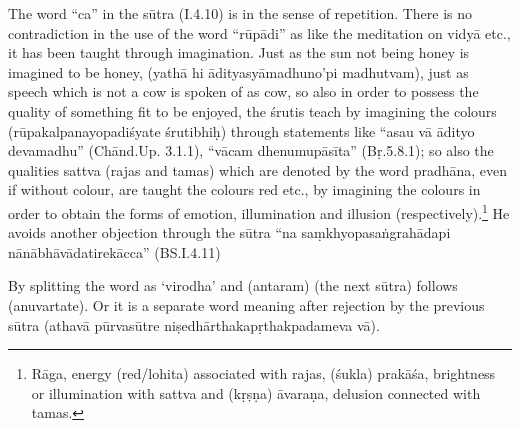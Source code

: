 The word “ca” in the sūtra (I.4.10) is in the sense of repetition. There is no contradiction in the use of the word “rūpādi” as like the meditation on vidyā etc., it has been taught through imagination. Just as the sun not being honey is  imagined to be  honey, (yathā hi ādityasyāmadhuno’pi madhutvam), just as speech which is not a cow is spoken of as cow, so also in order to possess the quality of something fit to be enjoyed, the śrutis teach by imagining the colours (rūpakalpanayopadiśyate śrutibhiḥ) through statements like “asau vā ādityo devamadhu” (Chānd.Up. 3.1.1), “vācam dhenumupāsīta” (Bṛ.5.8.1); so also the qualities sattva (rajas and tamas) which are denoted by the word pradhāna, even if without colour, are taught the colours red etc., by imagining the colours in order to obtain the forms of emotion, illumination and illusion (respectively).\footnote{Rāga,  energy (red/lohita) associated with rajas, (śukla) prakāśa, brightness or illumination with sattva and  (kṛṣṇa) āvaraṇa, delusion connected with tamas.} He avoids another objection through the sūtra “na saṃkhyopasaṅgrahādapi nānābhāvādatirekācca” (BS.I.4.11)

\textbf{}




By splitting the word as ‘virodha’ and (antaram) (the next sūtra) follows (anuvartate). Or it is a separate word meaning after rejection by the previous sūtra (athavā pūrvasūtre niṣedhārthakapṛthakpadameva vā).

